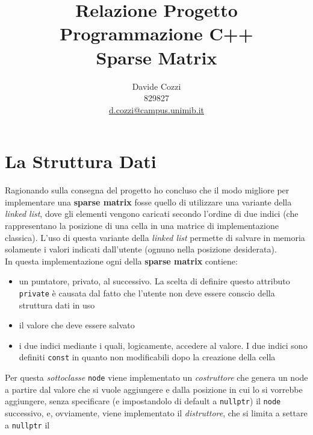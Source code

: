 \documentclass[a4paper,12pt, oneside]{article}
\title{Relazione Progetto\\
  Programmazione C++\\
  \large Sparse Matrix}
\author{Davide Cozzi\\
  829827\\
  \href{mailto:d.cozzi@campus.unimib.it}{d.cozzi@campus.unimib.it}}
\date{}
\begin{document}
\maketitle

\newtheorem{teorema}{Teorema}
\newtheorem{definizione}{Definizione}
\newtheorem{esempio}{Esempio}
\newtheorem{corollario}{Corollario}
\newtheorem{lemma}{Lemma}
\newtheorem{osservazione}{Osservazione}
\newtheorem{nota}{Nota}
\newtheorem{esercizio}{Esercizio}

\renewcommand{\chaptermark}[1]{%
  \markboth{\chaptername
    \ \thechapter.\ #1}{}}
\renewcommand{\sectionmark}[1]{\markright{\thesection.\ #1}}
\allsectionsfont{\centering}

\section*{La Struttura Dati}
Ragionando sulla consegna del progetto ho concluso che il modo
migliore per implementare una \textbf{sparse matrix} fosse quello di
utilizzare una variante della \textit{linked list}, dove gli elementi vengono
caricati secondo l'ordine di due indici (che rappresentano la
posizione di una cella in una matrice di implementazione
classica). L'uso di questa variante della \textit{linked list} permette di
salvare in memoria solamente i valori indicati dall'utente (ognuno
nella posizione desiderata).\\
In questa implementazione ogni  della \textbf{sparse matrix}
contiene:
\begin{itemize}
  \item un puntatore, privato, al  successivo. La scelta
  di definire questo attributo \texttt{private} è causata dal fatto
  che l'utente non deve essere conscio della struttura dati in uso
  \item il valore che deve essere salvato
  \item i due indici mediante i quali, logicamente, accedere al
  valore. I due indici sono definiti \texttt{const} in quanto non
  modificabili dopo la creazione della cella
\end{itemize}
Per questa \textit{sottoclasse} \texttt{node} viene implementato un
\textit{costruttore} che genera un node a partire dal valore che si vuole
aggiungere e dalla posizione in cui lo si vorrebbe aggiungere, senza
specificare (e impostandolo di default a \texttt{nullptr}) il
\texttt{node} successivo, e, ovviamente, viene implementato il
\textit{distruttore}, che si limita a settare a \texttt{nullptr} il
\end{document}
